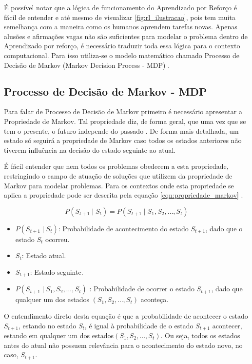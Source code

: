 É possível notar que a lógica de funcionamento do Aprendizado por Reforço é fácil de entender e até mesmo de visualizar \ref{fig:rl_ilustracao}, pois tem muita semelhança com a maneira como os humanos aprendem tarefas novas. Apenas alusões e afirmações vagas não são suficientes para modelar o problema dentro de Aprendizado por reforço, é necessário traduzir toda essa lógica para o contexto computacional. Para isso utiliza-se o modelo matemático chamado Processo de Decisão de Markov (Markov Decision Process - MDP) \cite{sutton}.

\subsection*{Processo de Decisão de Markov - MDP}

Para falar de Processo de Decisão de Markov primeiro é necessário apresentar a Propriedade de Markov. Tal propriedade diz, de forma geral, que uma vez que se tem o presente, o futuro independe do passado \cite{sutton}. De forma mais detalhada, um estado só seguirá a propriedade de Markov caso todos os estados anteriores não tiverem influência na decisão do estado seguinte ao atual.

É fácil entender que nem todos os problemas obedecem a esta propriedade, restringindo o campo de atuação de soluções que utilizem da propriedade de Markov para modelar problemas. Para os contextos onde esta propriedade se aplica a propriedade pode ser descrita pela equação \ref{eqn:propriedade_markov} \cite{sutton}.

\begin{equation}
    \label{eqn:propriedade_markov}
        P\left(S_{t+1} \mid S_t\right)=P\left(S_{t+1} \mid S_1, S_2, \ldots, S_t\right)
\end{equation}

\begin{itemize}
\item  \textbf{$P(S_{t+1} \mid S_t)$}: Probabilidade de acontecimento do estado $S_{t+1}$, dado que o estado $S_{t}$ ocorreu.
\item  \textbf{ $S_{t}$}: Estado atual.
\item  \textbf{ $S_{t+1}$}: Estado seguinte.
\item  \textbf{ $P(S_{t+1} \mid S_1, S_2, \ldots, S_t)$ }: Probabilidade de ocorrer o estado $S_{t+1}$, dado que qualquer um dos estados  $(S_1, S_2, \ldots, S_t)$ aconteça.
\end{itemize}


O entendimento direto desta equação é que a probabilidade de acontecer o estado  $S_{t+1}$, estando no estado  $S_t$, é igual à probabilidade de o estado  $S_{t+1}$ acontecer, estando em qualquer um dos estados$(S_1, S_2, \ldots, S_t)$. Ou seja, todos os estados antes do atual não possuem relevância para o acontecimento do estado novo, no caso,  $S_{t+1}$.

